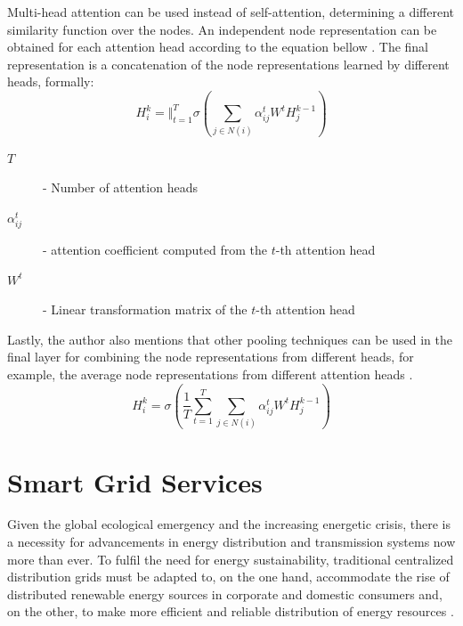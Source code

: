 Multi-head attention can be used instead of self-attention, determining a different similarity function over the nodes. An independent node representation can be obtained for each attention head according to the equation bellow \cite{velickovicGraphAttentionNetworks2018, tangGraphNeuralNetworks2022}. The final representation is a concatenation of the node representations learned by different heads, formally:
$$ H^k_i = \Big\Vert^T_{t=1} \sigma(\sum_{j \in N(i)} \alpha^t_{ij} W^t H^{k-1}_j)$$

\begin{description}
	\item[$T$] - Number of attention heads 
	\item[$\alpha^t_{ij}$] - attention coefficient computed from the $t$-th attention head 
	\item[$W^t$] - Linear transformation matrix of the $t$-th attention head 
\end{description}

Lastly, the author also mentions that other pooling techniques can be used in the final layer for combining the node representations from different heads, for example, the average node representations from different attention heads \cite{velickovicGraphAttentionNetworks2018, tangGraphNeuralNetworks2022}.
\begin{equation}
	H^k_i = \sigma(\frac{1}{T} \sum^T_{t = 1} \sum_{j \in N(i)} \alpha^t_{ij} W^t H^{k-1}_j)
\end{equation}


\section{Smart Grid Services} \label{sec:back-smart-grid}

Given the global ecological emergency and the increasing energetic crisis, there is a necessity for advancements in energy distribution and transmission systems now more than ever. To fulfil the need for energy sustainability, traditional centralized distribution grids must be adapted to, on the one hand, accommodate the rise of distributed renewable energy sources in corporate and domestic consumers and, on the other, to make more efficient and reliable distribution of energy resources \cite{farhangiPathSmartGrid2010, vijayapriyaSmartGridOverview2011}. \par


